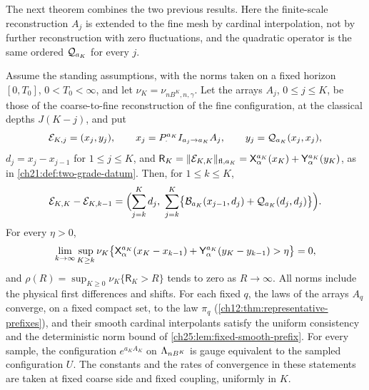 The next theorem combines the two previous results. Here the finite-scale reconstruction $A_j$ is extended to the fine mesh by cardinal interpolation, not by further reconstruction with zero fluctuations, and the quadratic operator is the same ordered $\mathcal Q_{a_K}$ for every $j$.

\begin{theorem}\label{ch25:thm:finite-mesh-prefix-control}
Assume the standing assumptions, with the norms taken on a fixed horizon $[0,T_0]$, $0<T_0<\infty$, and let $\nu_K=\nu_{nB^K,n,\gamma}$. Let the arrays $A_j$, $0\le j\le K$, be those of the coarse-to-fine reconstruction of the fine configuration, at the classical depths $J(K-j)$, and put
\[
 \mathcal E_{K,j}=(x_j,y_j),\qquad x_j=P_\cdot^{a_K}I_{a_j\to a_K}A_j,\qquad y_j=\mathcal Q_{a_K}(x_j,x_j),
\]
$d_j=x_j-x_{j-1}$ for $1\le j\le K$, and $\mathsf R_K=\lVert \mathcal E_{K,K}\rVert_{\mathrm{fl},a_K}=\mathsf X_{\alpha}^{a_K}(x_K)+\mathsf Y_{\alpha}^{a_K}(y_K)$, as in \cref{ch21:def:two-grade-datum}. Then, for $1\le k\le K$,
\begin{equation}\label{ch25:eq:exact-prefix-polarization}
 \mathcal E_{K,K}-\mathcal E_{K,k-1}=\Bigl(\sum_{j=k}^Kd_j,\ \sum_{j=k}^K\bigl\{\Polarized{a_K}(x_{j-1},d_j)+\Duhamel{a_K}(d_j,d_j)\bigr\}\Bigr).
\end{equation}
For every $\eta>0$,
\begin{equation}\label{ch25:eq:enhanced-prefix-error}
 \lim_{k\to\infty}\sup_{K\ge k}\nu_K\bigl\{\mathsf X_{\alpha}^{a_K}(x_K-x_{k-1})+\mathsf Y_{\alpha}^{a_K}(y_K-y_{k-1})>\eta\bigr\}=0,
\end{equation}
and $\rho(R)=\sup_{K\ge0}\nu_K\{\mathsf R_K>R\}$ tends to zero as $R\to\infty$. All norms include the physical first differences and shifts. For each fixed $q$, the laws of the arrays $A_q$ converge, on a fixed compact set, to the law $\pi_q$ (\cref{ch12:thm:representative-prefixes}), and their smooth cardinal interpolants satisfy the uniform consistency and the deterministic norm bound of \cref{ch25:lem:fixed-smooth-prefix}. For every sample, the configuration $e^{a_KA_K}$ on $\Lambda_{nB^K}$ is gauge equivalent to the sampled configuration $U$. The constants and the rates of convergence in these statements are taken at fixed coarse side and fixed coupling, uniformly in $K$.
\end{theorem}


